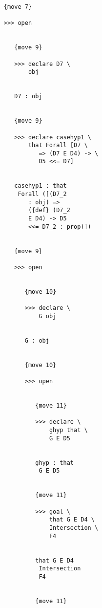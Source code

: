 \documentclass[12pt]{article}
\begin{document}
\begin{verbatim}
                        {move 7}

                        >>> open


                           {move 9}

                           >>> declare D7 \
                               obj


                           D7 : obj


                           {move 9}

                           >>> declare casehyp1 \
                               that Forall [D7 \
                                  => (D7 E D4) -> \
                                  D5 <<= D7]


                           casehyp1 : that 
                            Forall ([(D7_2 
                               : obj) => 
                               ({def} (D7_2 
                               E D4) -> D5 
                               <<= D7_2 : prop)])


                           {move 9}

                           >>> open


                              {move 10}

                              >>> declare \
                                  G obj


                              G : obj


                              {move 10}

                              >>> open


                                 {move 11}

                                 >>> declare \
                                     ghyp that \
                                     G E D5


                                 ghyp : that 
                                  G E D5


                                 {move 11}

                                 >>> goal \
                                     that G E D4 \
                                     Intersection \
                                     F4


                                 that G E D4 
                                  Intersection 
                                  F4


                                 {move 11}


\end{verbatim}
\end{document}
